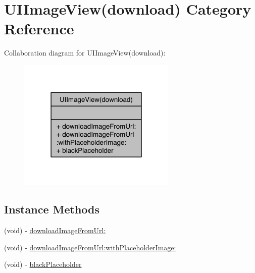 \hypertarget{category_u_i_image_view_07download_08}{\section{U\-I\-Image\-View(download) Category Reference}
\label{category_u_i_image_view_07download_08}
}


Collaboration diagram for U\-I\-Image\-View(download)\-:
\nopagebreak
\begin{figure}[H]
\begin{center}
\leavevmode
\includegraphics[width=214pt]{category_u_i_image_view_07download_08__coll__graph}
\end{center}
\end{figure}
\subsection*{Instance Methods}
\begin{DoxyCompactItemize}
\item 
(void) -\/ \hyperlink{category_u_i_image_view_07download_08_ab182ba728f0e0471ee615ca75884929e}{download\-Image\-From\-Url\-:}
\item 
(void) -\/ \hyperlink{category_u_i_image_view_07download_08_a5ecf68c528e178d92ce9dd6ed5350ed4}{download\-Image\-From\-Url\-:with\-Placeholder\-Image\-:}
\item 
(void) -\/ \hyperlink{category_u_i_image_view_07download_08_a28ebee3bf5bf53c2a0e43631e5ea0388}{black\-Placeholder}
\end{DoxyCompactItemize}


